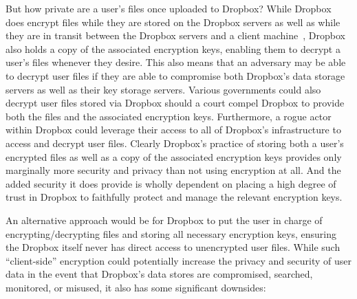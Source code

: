 But how private are a user's files once uploaded to Dropbox? While
Dropbox does encrypt files while they are stored on the Dropbox
servers as well as while they are in transit between the Dropbox
servers and a client machine~\cite{dropbox-security}, Dropbox also
holds a copy of the associated encryption keys, enabling them to
decrypt a user's files whenever they desire. This also means that an
adversary may be able to decrypt user files if they are able to
compromise both Dropbox's data storage servers as well as their key
storage servers. Various governments could also decrypt user files
stored via Dropbox should a court compel Dropbox to provide both the
files and the associated encryption keys. Furthermore, a rogue actor
within Dropbox could leverage their access to all of Dropbox's
infrastructure to access and decrypt user files. Clearly Dropbox's
practice of storing both a user's encrypted files as well as a copy of
the associated encryption keys provides only marginally more security
and privacy than not using encryption at all. And the added security
it does provide is wholly dependent on placing a high degree of trust
in Dropbox to faithfully protect and manage the relevant encryption
keys.

An alternative approach would be for Dropbox to put the user in charge
of encrypting/decrypting files and storing all necessary encryption
keys, ensuring the Dropbox itself never has direct access to
unencrypted user files. While such ``client-side'' encryption could
potentially increase the privacy and security of user data in the
event that Dropbox's data stores are compromised, searched, monitored,
or misused, it also has some significant downsides:

